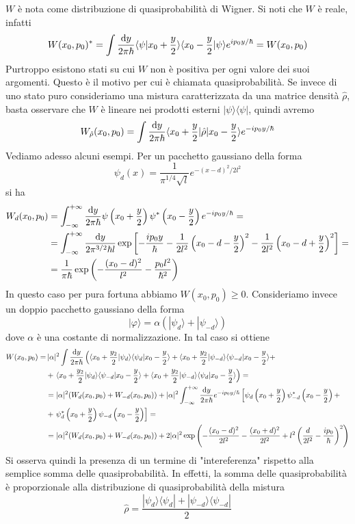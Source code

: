 \documentclass[a4paper, 11pt]{article}
\renewcommand{\ket}[1]{| #1\rangle}
\renewcommand{\bra}[1]{\langle #1|}
\begin{document}
$W$ è nota come distribuzione di quasiprobabilità di Wigner. Si noti che $W$ è reale, infatti
\[W(x_0,p_0)^*=\int\frac{\mathrm{d} y}{2\pi\hbar}\langle \psi\vert x_0+\frac{y}{2}\rangle\langle x_0-\frac{y}{2}\vert\psi\rangle e^{ip_0y/\hbar}=W(x_0,p_0)\]
Purtroppo esistono stati su cui $W$ non è positiva per ogni valore dei suoi argomenti. Questo è il motivo per cui è chiamata quasiprobabilità. Se invece di uno stato puro consideriamo una mistura caratterizzata da una matrice densità $\hat{\rho}$, basta osservare che $W$ è lineare nei prodotti esterni $\ket{\psi}\bra\psi$, quindi avremo
\[W_{\hat{\rho}}(x_0,p_0)=\int\frac{\mathrm{d} y}{2\pi\hbar}\langle x_0+\frac{y}{2}|\hat{\rho}|x_0-\frac{y}{2}\rangle e^{-ip_0y/\hbar}\]
Vediamo adesso alcuni esempi. Per un pacchetto gaussiano della forma
\[\psi_d(x)=\frac{1}{\pi^{1/4}\sqrt{l}}e^{-(x-d)^2/2l^2}\]
si ha
\begin{align*}
	W_d(x_0,p_0)&=\int_{-\infty}^{+\infty}\frac{\mathrm{d} y}{2\pi\hbar}\psi\left(x_0+\frac{y}{2}\right)\psi^*\left(x_0-\frac{y}{2}\right)e^{-ip_0y/\hbar}=\\&=\int_{-\infty}^{+\infty}\frac{\mathrm{d} y}{2\pi^{3/2}\hbar l}\exp\left[-\frac{ip_0y}{\hbar}-\frac{1}{2l^2}\left(x_0-d-\frac{y}{2}\right)^2-\frac{1}{2l^2}\left(x_0-d+\frac{y}{2}\right)^2\right]=\\&=\frac{1}{\pi\hbar}\exp\left(-\frac{(x_0-d)^2}{l^2}-\frac{p_0l^2}{\hbar^2}\right)
\end{align*}
In questo caso per pura fortuna abbiamo $W(x_0,p_0)\geq0$. Consideriamo invece un doppio pacchetto gaussiano della forma
\[\ket\varphi=\alpha(\ket{\psi_d}+\ket{\psi_{-d}})\]
dove $\alpha$ è una costante di normalizzazione. In tal caso
si ottiene
\begin{align*}
	W(x_0,p_0)=&\,|\alpha|^2\int\frac{\mathrm{d} y}{2\pi\hbar}\left(\langle x_0+\frac{y_2}{2}\vert\psi_d\rangle\langle \psi_d\vert x_0-\frac{y}{2}\rangle+\langle x_0+\frac{y_2}{2}\vert\psi_{-d}\rangle\langle \psi_{-d}\vert x_0-\frac{y}{2}\rangle+\right.\\&+\left.\langle x_0+\frac{y_2}{2}\vert\psi_d\rangle\langle \psi_{-d}\vert x_0-\frac{y}{2}\rangle+\langle x_0+\frac{y_2}{2}\vert\psi_{-d}\rangle\langle \psi_d\vert x_0-\frac{y}{2}\rangle\right)=\\&=|\alpha|^2(W_d(x_0,p_0)+W_{-d}(x_0,p_0))+|\alpha|^2\int_{-\infty}^{+\infty}\frac{\mathrm{d} y}{2\pi\hbar}e^{-ip_0y/\hbar}\left[\psi_d\left(x_0+\frac{y}{2}\right)\psi^*_{-d}\left(x_0-\frac{y}{2}\right)+\right.\\&+\left.\psi^*_d\left(x_0+\frac{y}{2}\right)\psi_{-d}\left(x_0-\frac{y}{2}\right)\right]=\\&=
	|\alpha|^2(W_d(x_0,p_0)+W_{-d}(x_0,p_0))+2|\alpha|^2\exp\left(-\frac{(x_0-d)^2}{2l^2}-\frac{(x_0+d)^2}{2l^2}+l^2\left(\frac{d}{2l^2}-\frac{ip_0}{\hbar}\right)^2\right)
\end{align*}
Si osserva quindi la presenza di un termine di "intereferenza" rispetto alla semplice somma delle quasiprobabilità. In effetti, la somma delle quasiprobabilità è proporzionale alla distribuzione di quasiprobabilità della mistura
\[\hat{\rho}=\frac{\ket{\psi_d}\bra{\psi_d}+\ket{\psi_{-d}}\bra{\psi_{-d}}}{2}\]
\end{document}
